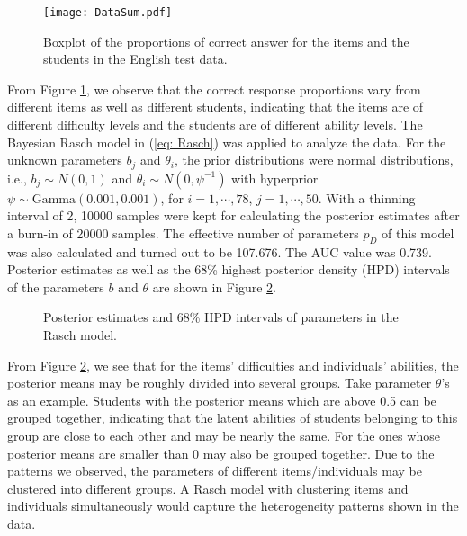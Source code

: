 \documentclass[12pt]{article}
\begin{document}
\begin{figure} [h!]
	\centering
	\texttt{[image: DataSum.pdf]}
	\caption{Boxplot of the proportions of correct answer for the items and the students in the English test data.  \label{fig: boxplot}}
\end{figure}

From Figure \ref{fig: boxplot}, we observe that the correct response proportions vary from different items as well as different students, indicating that the items are of different difficulty levels and the students are of different ability levels. The Bayesian Rasch model in (\ref{eq: Rasch}) was applied to analyze the data. For the unknown parameters $b_j$ and $\theta_i$, the prior distributions were normal distributions, i.e., $b_j \sim N(0,1)$ and $\theta_i \sim N(0,\psi^{-1})$ with hyperprior $\psi \sim \text{Gamma}(0.001, 0.001)$, for $i = 1, \cdots, 78$, $j = 1, \cdots, 50$. 
With a thinning interval of 2, 10000 samples were kept for calculating the posterior estimates after a burn-in of 20000 samples. 
The effective number of parameters $p_D$ of this model was also calculated and turned out to be 107.676. The AUC value was 0.739.
Posterior estimates as well as the 68\% highest posterior density (HPD) intervals of the parameters $b$ and $\theta$ are shown in Figure \ref{fig:Rasch_res}.

\begin{figure}[h!] 
	\centering  
	\caption{Posterior estimates and 68\% HPD intervals of parameters in the Rasch model.
	\label{fig:Rasch_res} }
\end{figure}

From Figure \ref{fig:Rasch_res}, we see that for the items' difficulties and individuals' abilities, the posterior means may be roughly divided into several groups. Take parameter $\theta$'s as an example. Students with the posterior means which are above 0.5 can be grouped together, indicating that the latent abilities of students belonging to this group are close to each other and may be nearly the same.  
For the ones whose posterior means are smaller than 0 may also be grouped together. Due to the patterns we observed, the parameters of different items/individuals may be clustered into different groups. A Rasch model with clustering items and individuals simultaneously would capture the heterogeneity patterns shown in the data.
\end{document}
